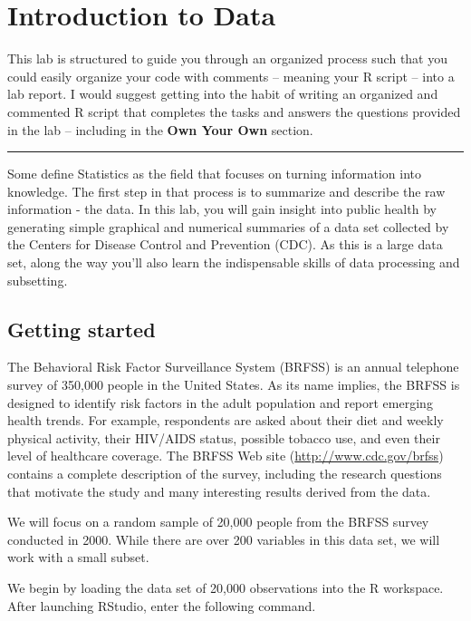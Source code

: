 \documentclass[]{book}
\theoremstyle{definition}
\theoremstyle{definition}
\theoremstyle{definition}
\theoremstyle{remark}
\begin{document}
\chapter{Introduction to Data}\label{introduction-to-data}

This lab is structured to guide you through an organized process such
that you could easily organize your code with comments -- meaning your R
script -- into a lab report. I would suggest getting into the habit of
writing an organized and commented R script that completes the tasks and
answers the questions provided in the lab -- including in the
\textbf{Own Your Own} section.

\begin{center}\rule{0.5\linewidth}{\linethickness}\end{center}

Some define Statistics as the field that focuses on turning information
into knowledge. The first step in that process is to summarize and
describe the raw information - the data. In this lab, you will gain
insight into public health by generating simple graphical and numerical
summaries of a data set collected by the Centers for Disease Control and
Prevention (CDC). As this is a large data set, along the way you'll also
learn the indispensable skills of data processing and subsetting.

\section{Getting started}\label{getting-started}

The Behavioral Risk Factor Surveillance System (BRFSS) is an annual
telephone survey of 350,000 people in the United States. As its name
implies, the BRFSS is designed to identify risk factors in the adult
population and report emerging health trends. For example, respondents
are asked about their diet and weekly physical activity, their HIV/AIDS
status, possible tobacco use, and even their level of healthcare
coverage. The BRFSS Web site (\url{http://www.cdc.gov/brfss}) contains a
complete description of the survey, including the research questions
that motivate the study and many interesting results derived from the
data.

We will focus on a random sample of 20,000 people from the BRFSS survey
conducted in 2000. While there are over 200 variables in this data set,
we will work with a small subset.

We begin by loading the data set of 20,000 observations into the R
workspace. After launching RStudio, enter the following command.
\end{document}
